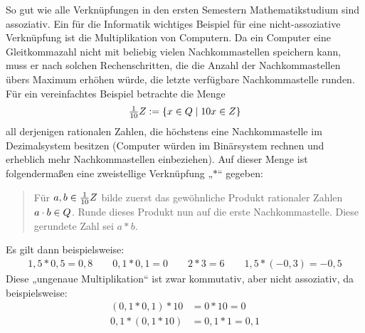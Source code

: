 \begin{bsp} \label{bsp:fehlerrech}
    So gut wie alle Verknüpfungen in den ersten Semestern Mathematikstudium sind assoziativ. Ein für die Informatik wichtiges Beispiel für eine nicht-assoziative Verknüpfung ist die Multiplikation von Computern. Da ein Computer eine Gleitkommazahl nicht mit beliebig vielen Nachkommastellen speichern kann, muss er nach solchen Rechenschritten, die die Anzahl der Nachkommastellen übers Maximum erhöhen würde, die letzte verfügbare Nachkommastelle runden. Für ein vereinfachtes Beispiel betrachte die Menge
        \[ \tfrac{1}{10}\relax Z := \{ x\in \relax Q \mid 10x\in \relax Z \} \]
    all derjenigen rationalen Zahlen, die höchstens eine Nachkommastelle im Dezimalsystem besitzen (Computer würden im Binärsystem rechnen und erheblich mehr Nachkommastellen einbeziehen). Auf dieser Menge ist folgendermaßen eine zweistellige Verknüpfung „$*$“ gegeben:
    \begin{quote}
        Für $a,b\in \frac{1}{10}\relax Z$ bilde zuerst das gewöhnliche Produkt rationaler Zahlen $a\cdot b \in \relax Q$. Runde dieses Produkt nun auf die erste Nachkommastelle. Diese gerundete Zahl sei $a*b$.
    \end{quote}
    Es gilt dann beispielsweise:
    \begin{align*}
        1{,}5* 0{,}5 = 0{,}8 \qquad 0{,}1* 0{,}1 = 0 \qquad 2*3 = 6 \qquad 1{,}5 * (-0{,}3)= -0{,}5 
    \end{align*}
    Diese „ungenaue Multiplikation“ ist zwar kommutativ, aber nicht assoziativ, da beispielsweise:
    \begin{align*}
        (0{,}1 * 0{,}1) * 10 & = 0*10 = 0 \\
        0{,}1*(0{,}1*10) & = 0{,}1*1 = 0{,}1
    \end{align*}
\end{bsp}


